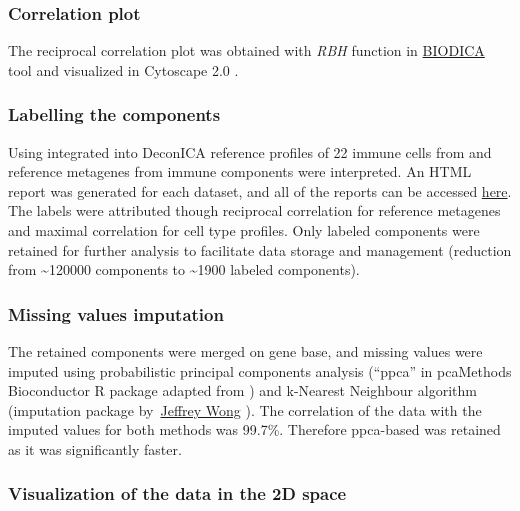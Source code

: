 \documentclass[12pt,]{book}
\theoremstyle{definition}
\theoremstyle{definition}
\theoremstyle{definition}
\theoremstyle{remark}
\begin{document}
\hypertarget{correlation-plot}{%
\subsubsection{Correlation plot}\label{correlation-plot}}

The reciprocal correlation plot was obtained with \emph{RBH} function in
\href{https://github.com/LabBandSB/BIODICA}{BIODICA} tool and visualized
in Cytoscape 2.0 \citep{Shannon2003}.

\hypertarget{labelling-the-components}{%
\subsubsection{Labelling the
components}\label{labelling-the-components}}

Using integrated into DeconICA reference profiles of 22 immune cells
from \citep{Newman2015} and reference metagenes from \citep{Biton2014}
immune components were interpreted. An HTML report was generated for
each dataset, and all of the reports can be accessed
\href{https://drive.google.com/drive/folders/1NmI3hKC4AXcKQ56_BZIbxynn9YVEGt78?usp=sharing}{here}.
The labels were attributed though reciprocal correlation for reference
metagenes and maximal correlation for cell type profiles. Only labeled
components were retained for further analysis to facilitate data storage
and management (reduction from \textasciitilde{}120000 components to
\textasciitilde{}1900 labeled components).

\hypertarget{missing-values-imputation}{%
\subsubsection{Missing values
imputation}\label{missing-values-imputation}}

The retained components were merged on gene base, and missing values
were imputed using probabilistic principal components analysis (``ppca''
in pcaMethods Bioconductor R package \citep{Stacklies2007} adapted from
\citep{Porta2005}) and k-Nearest Neighbour algorithm (imputation package
by~\href{https://www.rdocumentation.org/collaborators/name/Jeffrey\%20Wong}{Jeffrey
Wong} \citep{Cai2008, Troyanskaya2001}). The correlation of the data
with the imputed values for both methods was 99.7\%. Therefore
ppca-based was retained as it was significantly faster.

\hypertarget{visualization-of-the-data-in-the-2d-space}{%
\subsubsection{Visualization of the data in the 2D
space}\label{visualization-of-the-data-in-the-2d-space}}
\end{document}
